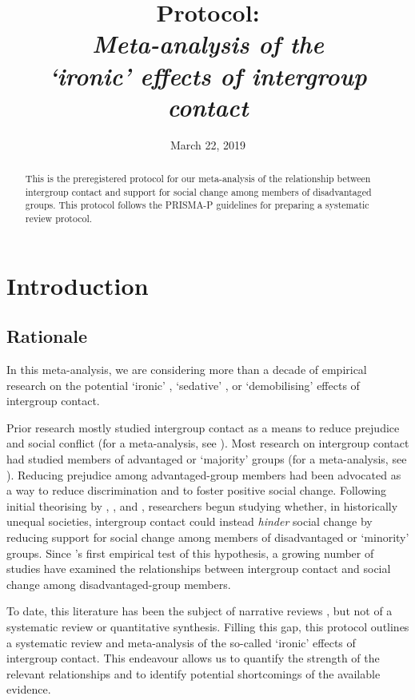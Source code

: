 \documentclass[10pt, a4paper]{article}
\title{Protocol:\\\textit{Meta-analysis of the\\`ironic' effects of intergroup contact}}
\date{March 22, 2019}
\begin{document}
\maketitle

\begin{abstract}
\noindent This is the preregistered protocol for our meta-analysis of the relationship between intergroup contact and support for social change among members of disadvantaged groups. This protocol follows the PRISMA-P guidelines \cite{moher_prismap_2015, shamseer_prismap_2015} for preparing a systematic review protocol.
\end{abstract}

\section{Introduction}

\subsection{Rationale}
\label{sec:rationale}

In this meta-analysis, we are considering more than a decade of empirical research \cite{dixon_intergroup_2007} on the potential `ironic' \cite{saguy_irony_2009}, `sedative' \cite{cakal_investigation_2011}, or `demobilising' \cite{dovidio_reducing_2017} effects of intergroup contact. 

Prior research  mostly studied intergroup contact as a means to reduce prejudice and social conflict (for a meta-analysis, see ). Most research on intergroup contact had studied members of advantaged or `majority' groups (for a meta-analysis, see ). Reducing prejudice among advantaged-group members had been advocated as a way to reduce discrimination and to foster positive social change. Following initial theorising by , , and , researchers begun studying whether, in historically unequal societies, intergroup contact could instead \emph{hinder} social change by reducing support for social change among members of disadvantaged or `minority' groups. Since \citeauthor{dixon_intergroup_2007}'s \citeyear{dixon_intergroup_2007} first empirical test of this hypothesis, a growing number of studies have examined the relationships between intergroup contact and social change among disadvantaged-group members.

To date, this literature has been the subject of narrative reviews \cite<for example,>{mckeown_contact_2017}, but not of a systematic review or quantitative synthesis. Filling this gap, this protocol outlines a systematic review and meta-analysis of the so-called `ironic' effects of intergroup contact. This endeavour allows us to quantify the strength of the relevant relationships and to identify potential shortcomings of the available evidence.
\end{document}
